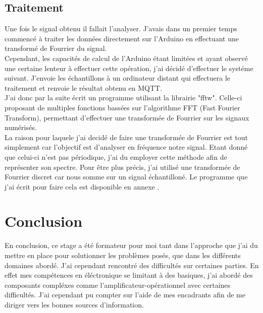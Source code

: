 \documentclass[12pt,french,a4paper]{article}
\begin{document}
\subsection{Traitement}

Une fois le signal obtenu il fallait l'analyser. J'avais dans un premier temps commencé à traiter les données directement sur l'Arduino en effectuant une transformé de Fourrier du signal.\\ 
Cependant, les capacités de calcul de l'Arduino étant limitées et ayant observé une certaine lenteur à effectuer cette opération, j'ai décidé d'effectuer le systéme suivant. J'envoie les échantillons à un ordinateur distant qui effectuera le traitement et renvoie le résultat obtenu en MQTT.\\
J'ai donc par la suite écrit un programme utilisant la librairie "fftw". Celle-ci proposant de multiples fonctions bassées sur l'algorithme FFT (Fast Fourier Transform), permettant d'effectuer une transformée de Fourrier sur les signaux numérisés.\\
La raison pour laquele j'ai decidé de faire une transformée de Fourrier est tout simplement car l'objectif est d'analyser en fréquence notre signal. Etant donné que celui-ci n'est pas périodique, j'ai du employer cette méthode afin de représenter son spectre. Pour être plus précis, j'ai utilisé une transformée de Fourrier discret car nous somme sur un signal échantilloné. 
Le programme que j'ai écrit pour faire cela est disponible en annexe .  


\newpage
\section{Conclusion}
En conclusion, ce stage a été formateur pour moi tant dans l'approche que j'ai du mettre en place pour solutionner les problèmes posés, que dans les différents domaines abordé. J'ai cependant rencontré des difficultés sur certaines parties. En effet mes compétences en éléctronique se limitant à des basiques, j'ai abordé des composants compléxes comme l'amplificateur-opérationnel avec certaines difficultés. J'ai cependant pu compter sur l'aide de mes encadrants afin de me diriger vers les bonnes sources d'information.


\newpage
\listoffigures
\newpage

\end{document}
